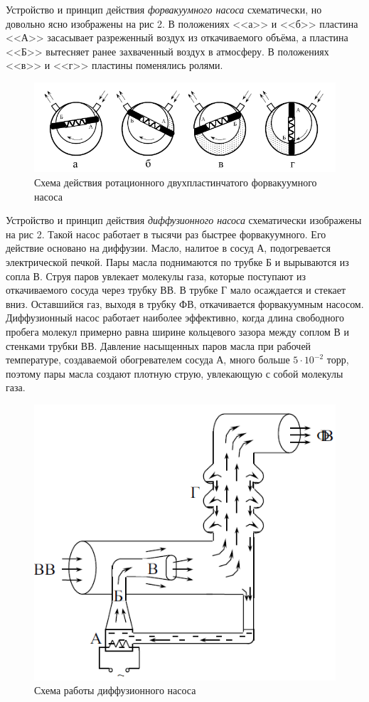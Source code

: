 \documentclass[a4paper, 12pt]{article}
\begin{document}
Устройство и принцип действия \textit{форвакуумного насоса} схематически, но довольно ясно изображены на рис 2. В положениях <<а>> и <<б>> пластина <<А>> засасывает разреженный воздух из откачиваемого объёма, а пластина <<Б>> вытесняет ранее захваченный воздух в атмосферу. В положениях <<в>> и <<г>> пластины поменялись ролями.
\begin{figure}[!h]
\centering
\includegraphics[width=0.9\linewidth]{forvakuum.png}
\caption[]{Схема действия ротационного двухпластинчатого форвакуумного насоса}
\label{fig:Схема ФВ насоса}
\end{figure}
Устройство и принцип действия \textit{диффузионного насоса} схематически изображены на рис 2. Такой насос работает в тысячи раз быстрее форвакуумного. Его действие основано на диффузии. Масло, налитое в сосуд А, подогревается электрической печкой. Пары масла поднимаются по трубке Б и вырываются из сопла В. Струя паров увлекает молекулы газа, которые поступают из откачиваемого сосуда через трубку ВВ. В трубке Г мало осаждается и стекает вниз. Оставшийся газ, выходя в трубку ФВ, откачивается форвакуумным насосом. \\
Диффузионный насос работает наиболее эффективно, когда длина свободного пробега молекул примерно равна ширине кольцевого зазора между соплом В и стенками трубки ВВ. Давление насыщенных паров масла при рабочей температуре, создаваемой обогревателем сосуда А, много больше $5\cdot 10^{-2}$ торр, поэтому пары масла создают плотную струю, увлекающую с собой молекулы газа.
\begin{figure}[!h]
\centering
\includegraphics[width=0.4\linewidth]{highvakuum.png}
\caption[]{Схема работы диффузионного насоса}
\label{fig:Схема ВВ насоса}
\end{figure}
\end{document}
